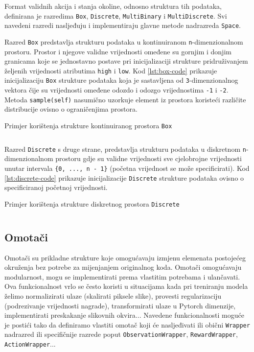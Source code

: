Format validnih akcija i stanja okoline, odnosno struktura tih podataka, definirana je razredima \texttt{Box}, \texttt{Discrete}, \texttt{MultiBinary} i \texttt{MultiDiscrete}. Svi navedeni razredi nasljeđuju i implementiraju glavne metode nadrazreda \texttt{Space}. 

Razred \texttt{Box} predstavlja strukturu podataka u kontinuiranom \texttt{n}-dimenzionalnom prostoru. Prostor i njegove validne vrijednosti omeđene su gornjim i donjim granicama koje se jednostavno postave pri inicijalizaciji strukture pridruživanjem željenih vrijednosti atributima \texttt{high} i \texttt{low}. Kod \ref{lst:box-code} prikazuje inicijalizaciju \texttt{Box} strukture podataka koja je sastavljena od \texttt{3}-dimenzionalnog vektora čije su vrijednosti omeđene odozdo i odozgo vrijednostima \texttt{-1} i \texttt{-2}. Metoda \texttt{sample(self)} nasumično uzorkuje element iz prostora koristeći različite distribucije ovisno o ograničenjima prostora.

\begin{listing}[H]
    \caption{Primjer korištenja strukture kontinuiranog prostora \texttt{Box}}
    \inputminted{python}{snippets/box.txt}
    \label{lst:box-code}
\end{listing}

Razred \texttt{Discrete} s druge strane, predstavlja strukturu podataka u diskretnom \texttt{n}-dimenzionalnom prostoru gdje su validne vrijednosti sve cjelobrojne vrijednosti unutar intervala \texttt{\{0, ..., n - 1\}} (početna vrijednost se može specificirati). Kod \ref{lst:discrete-code} prikazuje inicijalizacije \texttt{Discrete} strukture podataka ovisno o specificiranoj početnoj vrijednosti.

\begin{listing}[H]
    \caption{Primjer korištenja strukture diskretnog prostora \texttt{Discrete}}
    \inputminted{python}{snippets/discrete.txt}
    \label{lst:discrete-code}
\end{listing}

\subsection{Omotači}

Omotači  su prikladne strukture koje omogućavaju izmjenu elemenata postojećeg okruženja bez potrebe za mijenjanjem originalnog koda. Omotači omogućavaju modularnost, mogu se implementirati prema vlastitim potrebama i ulančavati. Ova funkcionalnost vrlo se često koristi u situacijama kada pri treniranju modela želimo normalizirati ulaze (skalirati piksele slike), provesti regularizaciju (podrezivanje vrijednosti nagrade), transformirati ulaze u Pytorch dimenzije, implementirati preskakanje slikovnih okvira...  Navedene funkcionalnosti moguće je postići tako da definiramo vlastiti omotač koji će nasljeđivati ili obični \texttt{Wrapper} nadrazred ili specifičnije razrede poput \texttt{ObservationWrapper}, \texttt{RewardWrapper}, \texttt{ActionWrapper}...

